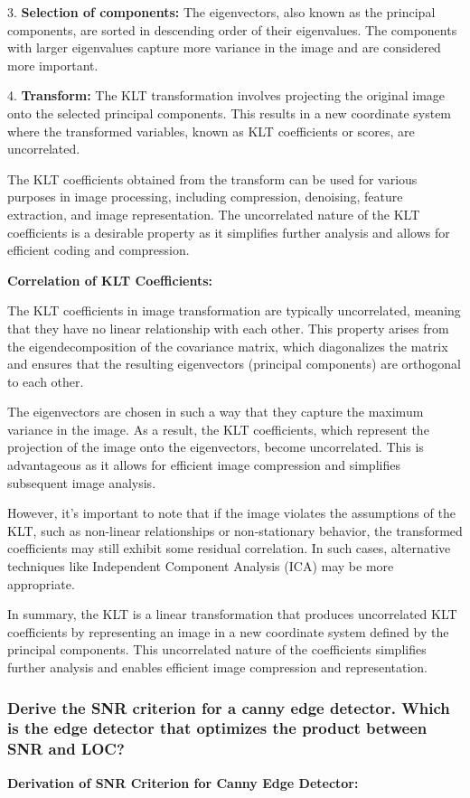 \documentclass{article}
\begin{document}
3. \textbf{Selection of components:} The eigenvectors, also known as the principal components, are sorted in descending order of their eigenvalues. The components with larger eigenvalues capture more variance in the image and are considered more important.

4. \textbf{Transform:} The KLT transformation involves projecting the original image onto the selected principal components. This results in a new coordinate system where the transformed variables, known as KLT coefficients or scores, are uncorrelated.

The KLT coefficients obtained from the transform can be used for various purposes in image processing, including compression, denoising, feature extraction, and image representation. The uncorrelated nature of the KLT coefficients is a desirable property as it simplifies further analysis and allows for efficient coding and compression.

\textbf{Correlation of KLT Coefficients:}

The KLT coefficients in image transformation are typically uncorrelated, meaning that they have no linear relationship with each other. This property arises from the eigendecomposition of the covariance matrix, which diagonalizes the matrix and ensures that the resulting eigenvectors (principal components) are orthogonal to each other.

The eigenvectors are chosen in such a way that they capture the maximum variance in the image. As a result, the KLT coefficients, which represent the projection of the image onto the eigenvectors, become uncorrelated. This is advantageous as it allows for efficient image compression and simplifies subsequent image analysis.

However, it's important to note that if the image violates the assumptions of the KLT, such as non-linear relationships or non-stationary behavior, the transformed coefficients may still exhibit some residual correlation. In such cases, alternative techniques like Independent Component Analysis (ICA) may be more appropriate.

In summary, the KLT is a linear transformation that produces uncorrelated KLT coefficients by representing an image in a new coordinate system defined by the principal components. This uncorrelated nature of the coefficients simplifies further analysis and enables efficient image compression and representation.

\subsubsection{Derive the SNR criterion for a canny edge detector. Which is the edge detector that optimizes the product between SNR and LOC?}
\textbf{Derivation of SNR Criterion for Canny Edge Detector:}
\end{document}
